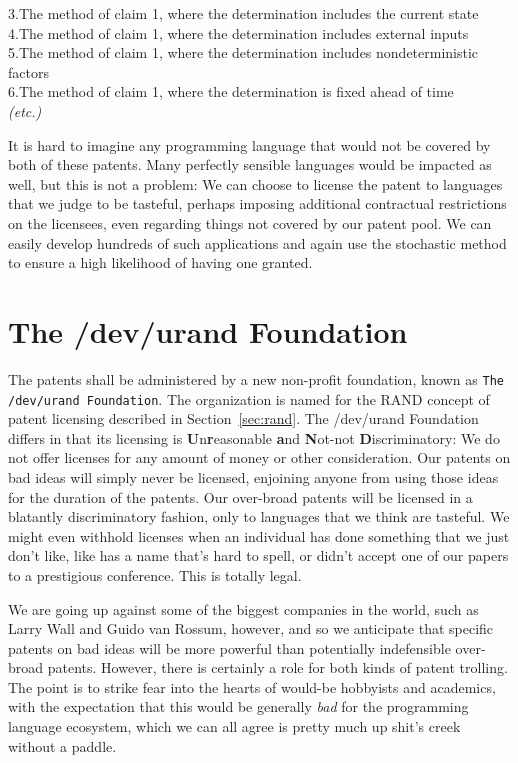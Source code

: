 \documentclass[acmtocl]%
{boviktrans}
\begin{document}
3.\quad The method of claim 1, where the determination includes the current state \\

4.\quad The method of claim 1, where the determination includes external inputs \\

5.\quad The method of claim 1, where the determination includes nondeterministic factors \\

6.\quad The method of claim 1, where the determination is fixed ahead of time \\

{\it (etc.)}

It is hard to imagine any programming language that would not be
covered by both of these patents. Many perfectly sensible languages
would be impacted as well, but this is not a problem: We can choose to
license the patent to languages that we judge to be tasteful, perhaps
imposing additional contractual restrictions on the licensees, even
regarding things not covered by our patent pool. We can easily
develop hundreds of such applications and again use the stochastic
method to ensure a high likelihood of having one granted.

\section{The /dev/urand Foundation}

The patents shall be administered by a new non-profit foundation,
known as {\tt The /dev/urand Foundation}. The organization is named for the
RAND concept of patent licensing described in Section~\ref{sec:rand}. 
The /dev/urand Foundation differs in that its licensing is {\bf
  U}n{\bf r}easonable {\bf a}nd {\bf N}ot-not {\bf D}iscriminatory: We
do not offer licenses for any amount of money or other consideration.
Our patents on bad ideas will simply never be licensed, enjoining
anyone from using those ideas for the duration of the patents. 
Our over-broad patents will be licensed
in a blatantly discriminatory fashion, only to languages that we think
are tasteful. 
We might even withhold licenses when an individual has
done something that we just don't like, like has a name that's hard to
spell, or didn't accept one of our papers to a prestigious
conference. This is totally legal.

We are going up against some of the biggest companies in the world,
such as Larry Wall and Guido van Rossum, however, and so we anticipate
that specific patents on bad ideas will be more powerful than 
potentially indefensible over-broad patents. However, there is certainly
a role for both kinds of patent trolling.
The point is to strike fear into the hearts of would-be hobbyists and
academics, with the expectation that this would be generally {\it bad}
for the programming language ecosystem, which we can all agree is
pretty much up shit's creek without a paddle.
\end{document}
